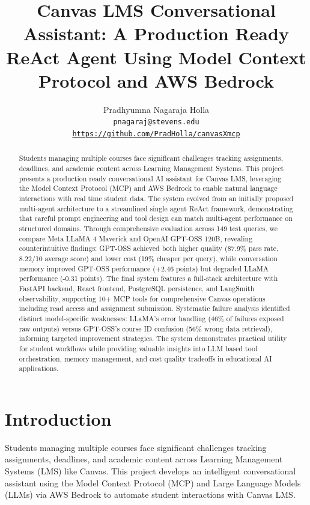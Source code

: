 \documentclass{article}
\title{Canvas LMS Conversational Assistant: A Production Ready ReAct Agent Using Model Context Protocol and AWS Bedrock}
\author{%
   Pradhyumna Nagaraja Holla \\
 \texttt{pnagaraj@stevens.edu} \\
 \texttt{\url{https://github.com/PradHolla/canvasXmcp}}
}
\begin{document}
\maketitle

\begin{abstract}
Students managing multiple courses face significant challenges tracking assignments, deadlines, and academic content across Learning Management Systems. This project presents a production ready conversational AI assistant for Canvas LMS, leveraging the Model Context Protocol (MCP) and AWS Bedrock to enable natural language interactions with real time student data. The system evolved from an initially proposed multi-agent architecture to a streamlined single agent ReAct framework, demonstrating that careful prompt engineering and tool design can match multi-agent performance on structured domains. Through comprehensive evaluation across 149 test queries, we compare Meta LLaMA 4 Maverick and OpenAI GPT-OSS 120B, revealing counterintuitive findings: GPT-OSS achieved both higher quality (87.9\% pass rate, 8.22/10 average score) and lower cost (19\% cheaper per query), while conversation memory improved GPT-OSS performance (+2.46 points) but degraded LLaMA performance (-0.31 points). The final system features a full-stack architecture with FastAPI backend, React frontend, PostgreSQL persistence, and LangSmith observability, supporting 10+ MCP tools for comprehensive Canvas operations including read access and assignment submission. Systematic failure analysis identified distinct model-specific weaknesses: LLaMA's error handling (46\% of failures exposed raw outputs) versus GPT-OSS's course ID confusion (56\% wrong data retrieval), informing targeted improvement strategies. The system demonstrates practical utility for student workflows while providing valuable insights into LLM based tool orchestration, memory management, and cost quality tradeoffs in educational AI applications.
\end{abstract}


\section{Introduction}

Students managing multiple courses face significant challenges tracking assignments, deadlines, and academic content across Learning Management Systems (LMS) like Canvas. This project develops an intelligent conversational assistant using the Model Context Protocol (MCP) and Large Language Models (LLMs) via AWS Bedrock to automate student interactions with Canvas LMS.
\end{document}

